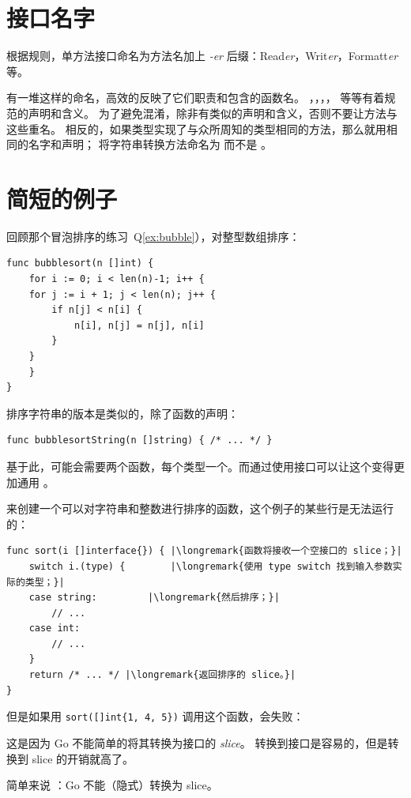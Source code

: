 \section{接口名字}
根据规则，单方法接口命名为方法名加上 \emph{-er} 后缀：Read\emph{er}，Writ\emph{er}，Formatt\emph{er} 等。

有一堆这样的命名，高效的反映了它们职责和包含的函数名。
，，，， 等等有着规范的声明和含义。
为了避免混淆，除非有类似的声明和含义，否则不要让方法与这些重名。
相反的，如果类型实现了与众所周知的类型相同的方法，那么就用相同的名字和声明；
将字符串转换方法命名为  而不是 。

\section{简短的例子}
\label{sec:a sorting example}
回顾那个冒泡排序的练习~Q\ref{ex:bubble}），对整型数组排序：
\begin{lstlisting}
func bubblesort(n []int) {
    for i := 0; i < len(n)-1; i++ {
	for j := i + 1; j < len(n); j++ {
	    if n[j] < n[i] {
		    n[i], n[j] = n[j], n[i]
	    }
	}
    }
}
\end{lstlisting}
排序字符串的版本是类似的，除了函数的声明：
\begin{lstlisting}
func bubblesortString(n []string) { /* ... */ }
\end{lstlisting}
基于此，可能会需要两个函数，每个类型一个。而通过使用接口可以让这个变得更加通用 。

来创建一个可以对字符串和整数进行排序的函数，这个例子的某些行是无法运行的：
\begin{lstlisting}
func sort(i []interface{}) { |\longremark{函数将接收一个空接口的 slice；}|
    switch i.(type) {        |\longremark{使用 type switch 找到输入参数实际的类型；}|
	case string:         |\longremark{然后排序；}|
	    // ...
	case int:
	    // ...
    }
    return /* ... */ |\longremark{返回排序的 slice。}|
}
\end{lstlisting}
\showremarks
但是如果用 \lstinline|sort([]int{1, 4, 5})| 调用这个函数，会失败：
\noindent{}

这是因为 Go 不能简单的将其转换为接口的 \emph{slice}。
转换到接口是容易的，但是转换到 slice 的开销就高了。

简单来说
：Go 不能（隐式）转换为 slice。

